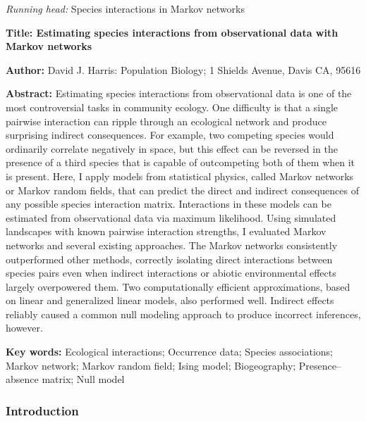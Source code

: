 \documentclass[12pt,]{article}
\date{}
\begin{document}
\begin{spacing}{1.9}
\begin{flushleft}
\emph{Running head:} Species interactions in Markov networks

\textbf{Title: Estimating species interactions from observational data
with Markov networks}

\textbf{Author:} David J. Harris: Population Biology; 1 Shields Avenue,
Davis CA, 95616

\textbf{Abstract:} Estimating species interactions from observational
data is one of the most controversial tasks in community ecology. One
difficulty is that a single pairwise interaction can ripple through an
ecological network and produce surprising indirect consequences. For
example, two competing species would ordinarily correlate negatively in
space, but this effect can be reversed in the presence of a third
species that is capable of outcompeting both of them when it is present.
Here, I apply models from statistical physics, called Markov networks or
Markov random fields, that can predict the direct and indirect
consequences of any possible species interaction matrix. Interactions in
these models can be estimated from observational data via maximum
likelihood. Using simulated landscapes with known pairwise interaction
strengths, I evaluated Markov networks and several existing approaches.
The Markov networks consistently outperformed other methods, correctly
isolating direct interactions between species pairs even when indirect
interactions or abiotic environmental effects largely overpowered them.
Two computationally efficient approximations, based on linear and
generalized linear models, also performed well. Indirect effects
reliably caused a common null modeling approach to produce incorrect
inferences, however.

\textbf{Key words:} Ecological interactions; Occurrence data; Species
associations; Markov network; Markov random field; Ising model;
Biogeography; Presence--absence matrix; Null model

\setlength{\parindent}{1cm} \setlength{\parskip}{6pt}

\subsubsection{Introduction}\label{introduction}


\end{flushleft}
\end{spacing}
\end{document}
